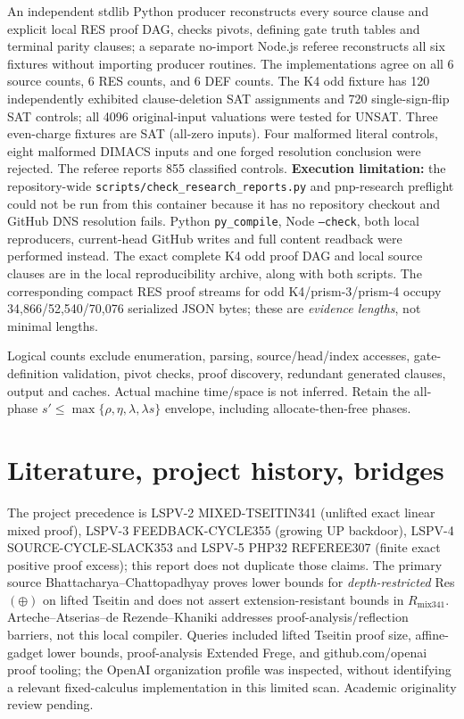\documentclass[11pt]{article}
\begin{document}
An independent stdlib Python producer reconstructs every source clause and explicit local RES proof DAG, checks pivots, defining gate truth tables and terminal parity clauses; a separate no-import Node.js referee reconstructs all six fixtures without importing producer routines. The implementations agree on all 6 source counts, 6 RES counts, and 6 DEF counts. The K4 odd fixture has 120 independently exhibited clause-deletion SAT assignments and 720 single-sign-flip SAT controls; all 4096 original-input valuations were tested for UNSAT. Three even-charge fixtures are SAT (all-zero inputs). Four malformed literal controls, eight malformed DIMACS inputs and one forged resolution conclusion were rejected. The referee reports 855 classified controls. \textbf{Execution limitation:} the repository-wide \texttt{scripts/check\_research\_reports.py} and pnp-research preflight could not be run from this container because it has no repository checkout and GitHub DNS resolution fails. Python \texttt{py\_compile}, Node \texttt{--check}, both local reproducers, current-head GitHub writes and full content readback were performed instead. The exact complete K4 odd proof DAG and local source clauses are in the local reproducibility archive, along with both scripts. The corresponding compact RES proof streams for odd K4/prism-3/prism-4 occupy 34,866/52,540/70,076 serialized JSON bytes; these are \emph{evidence lengths}, not minimal lengths.

Logical counts exclude enumeration, parsing, source/head/index accesses, gate-definition validation, pivot checks, proof discovery, redundant generated clauses, output and caches. Actual machine time/space is not inferred. Retain the all-phase $s'\le\max\{\rho,\eta,\lambda,\lambda s\}$ envelope, including allocate-then-free phases.

\section*{Literature, project history, bridges}
The project precedence is LSPV-2 MIXED-TSEITIN341 (unlifted exact linear mixed proof), LSPV-3 FEEDBACK-CYCLE355 (growing UP backdoor), LSPV-4 SOURCE-CYCLE-SLACK353 and LSPV-5 PHP32 REFEREE307 (finite exact positive proof excess); this report does not duplicate those claims. The primary source Bhattacharya--Chattopadhyay \cite{BC} proves lower bounds for \emph{depth-restricted} Res$(\oplus)$ on lifted Tseitin and does not assert extension-resistant bounds in $R_{\mathrm{mix341}}$. Arteche--Atserias--de Rezende--Khaniki \cite{PAP} addresses proof-analysis/reflection barriers, not this local compiler. Queries included lifted Tseitin proof size, affine-gadget lower bounds, proof-analysis Extended Frege, and github.com/openai proof tooling; the OpenAI organization profile was inspected, without identifying a relevant fixed-calculus implementation in this limited scan. Academic originality review pending.
\end{document}
